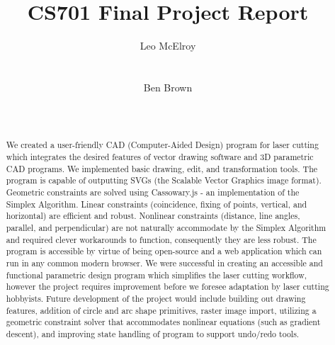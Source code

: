 \documentclass{sig-alternate-05-2015}
\begin{document}
\title{CS701 Final Project Report}


\author{
%
\alignauthor
Leo McElroy\\
       \\
       \\
\alignauthor
Ben Brown\\
       \\
       \\
}

\maketitle

\begin{abstract}

We created a user-friendly CAD (Computer-Aided Design) program for laser cutting which integrates the desired features of vector drawing software and 3D parametric CAD programs. We implemented basic drawing, edit, and transformation tools. The program is capable of outputting SVGs (the Scalable Vector Graphics image format). Geometric constraints are solved using Cassowary.js - an implementation of the Simplex Algorithm. Linear constraints (coincidence, fixing of points, vertical, and horizontal) are efficient and robust. Nonlinear constraints (distance, line angles, parallel, and perpendicular) are not naturally accommodate by the Simplex Algorithm and required clever workarounds to function, consequently they are less robust. The program is accessible by virtue of being open-source and a web application which can run in any common modern browser. We were successful in creating an accessible and functional parametric design program which simplifies the laser cutting workflow, however the project requires improvement before we foresee adaptation by laser cutting hobbyists. Future development of the project would include building out drawing features, addition of circle and arc shape primitives, raster image import, utilizing a geometric constraint solver that accommodates nonlinear equations (such as gradient descent), and improving state handling of program to support undo/redo tools. 

\end{abstract}



















\end{document}
